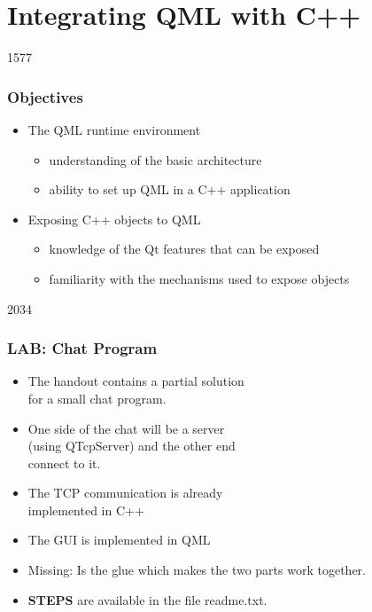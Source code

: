 %
%
%
%

\section{Integrating QML with C++}

\begin{slide}{1577}\frametitle{Objectives}

\begin{itemize}
\item The QML runtime environment
  \begin{itemize}
  \item understanding of the basic architecture
  \item ability to set up QML in a C++ application
  \end{itemize}
\item Exposing C++ objects to QML
  \begin{itemize}
  \item knowledge of the Qt features that can be exposed
  \item familiarity with the mechanisms used to expose objects
  \end{itemize}
\end{itemize}
\end{slide}






\begin{slide}{2034}\frametitle{LAB: Chat Program}
  \begin{itemize}
  \item The handout contains a partial solution\\
    for a small chat program.
  \item One side of the chat will be a server\\
    (using QTcpServer) and the other end\\
    connect to it.
  \item The TCP communication is already\\
    implemented in C++
  \item The GUI is implemented in QML
  \item Missing: Is the glue which makes the two parts work together.
  \item \textbf{STEPS} are available in the file readme.txt.
  \end{itemize}
\end{slide}
